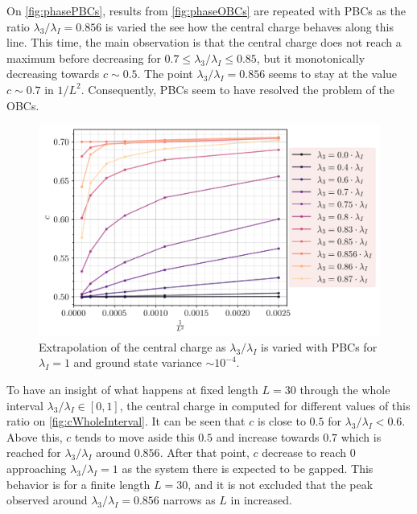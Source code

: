 	On \autoref{fig:phasePBCs}, results from \autoref{fig:phaseOBCs} are repeated with PBCs as the ratio $\lambda_3/\lambda_I=0.856$ is varied the see how the central charge behaves along this line. This time, the main observation is that the central charge does not reach a maximum before decreasing for $0.7\leq\lambda_3/\lambda_I\leq0.85$, but it monotonically decreasing towards $c\sim 0.5$. The point $\lambda_3/\lambda_I=0.856$ seems to stay at the value $c \sim 0.7$ in $1/L^2$. Consequently, PBCs seem to have resolved the problem of the OBCs.

	\begin{figure}[h!]
		\centering
		\includegraphics[scale=0.66]{../graphs/phase/pbc/J=1.0_h=1.0_i=1.0_c=0.0.png}
		\caption{Extrapolation of the central charge as $\lambda_3/\lambda_I$ is varied with PBCs for $\lambda_I=1$ and ground state variance $\sim 10^{-4}$.}
		\label{fig:phasePBCs}
	\end{figure}

	To have an insight of what happens at fixed length $L=30$ through the whole interval $\lambda_3/\lambda_I \in [0, 1]$, the central charge in computed for different values of this ratio on \autoref{fig:cWholeInterval}. It can be seen that $c$ is close to $0.5$ for $\lambda_3/\lambda_I<0.6$. Above this, $c$ tends to move aside this $0.5$ and increase towards $0.7$ which is reached for $\lambda_3/\lambda_I$ around $0.856$. After that point, $c$ decrease to reach $0$ approaching $\lambda_3/\lambda_I=1$ as the system there is expected to be gapped. This behavior is for a finite length $L=30$, and it is not excluded that the peak observed around $\lambda_3/\lambda_I=0.856$ narrows as $L$ in increased.


